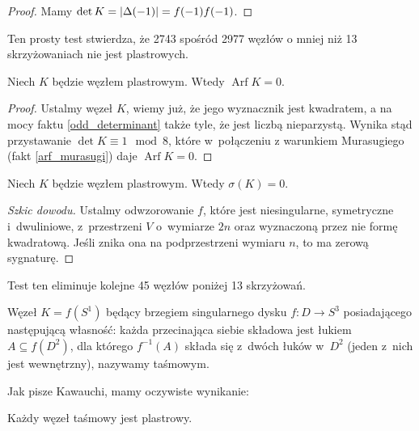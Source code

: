 \begin{proof}
    Mamy $\det K = |\Delta(-1)| = f(-1) f(-1)$.
\end{proof}

Ten prosty test stwierdza, że 2743 spośród 2977 węzłów o mniej niż 13 skrzyżowaniach nie jest plastrowych.

\begin{proposition}
    Niech $K$ będzie węzłem plastrowym.
    Wtedy $\operatorname{Arf} K = 0$.
\end{proposition}

\begin{proof}
    Ustalmy węzeł $K$, wiemy już, że jego wyznacznik jest kwadratem, a na mocy faktu \ref{odd_determinant} także tyle, że jest liczbą nieparzystą.
    Wynika stąd przystawanie $\det K \equiv 1 \mod 8$, które w~połączeniu z warunkiem Murasugiego (fakt \ref{arf_murasugi}) daje $\operatorname{Arf} K = 0$.
\end{proof}

\begin{proposition} \label{slice_signature}
    Niech $K$ będzie węzłem plastrowym.
    Wtedy $\sigma(K) = 0$.
\end{proposition}

\begin{proof}[Szkic dowodu]
    Ustalmy odwzorowanie $f$, które jest niesingularne, symetryczne i~dwuliniowe, z~przestrzeni $V$ o~wymiarze $2n$ oraz wyznaczoną przez nie formę kwadratową.
    Jeśli znika ona na podprzestrzeni wymiaru $n$, to ma zerową sygnaturę.
\end{proof}

Test ten eliminuje kolejne 45 węzłów poniżej 13 skrzyżowań.

\begin{definition}
    Węzeł $K = f(S^1)$ będący brzegiem singularnego dysku $f \colon D \to S^3$ posiadającego następującą własność: każda przecinająca siebie składowa jest łukiem $A \subseteq f(D^2)$, dla którego $f^{-1}(A)$ składa się z~dwóch łuków w~$D^2$ (jeden z~nich jest wewnętrzny), nazywamy taśmowym.
\end{definition}

Jak pisze Kawauchi, mamy oczywiste wynikanie:

\begin{proposition}
    Każdy węzeł taśmowy jest plastrowy.
\end{proposition}

